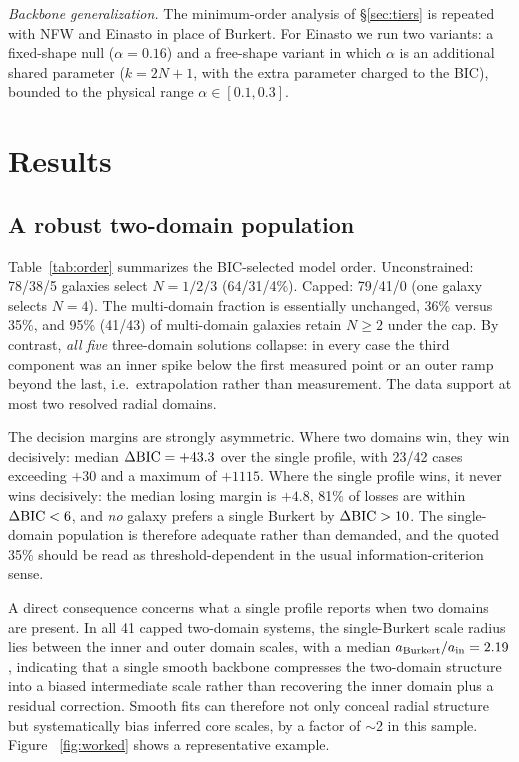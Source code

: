 \documentclass[twocolumn]{aastex701}
\newcommand{\dbic}{\Delta{\rm BIC}}
\begin{document}
\emph{Backbone generalization.} The minimum-order analysis of
\S\ref{sec:tiers} is repeated with NFW and Einasto in place of Burkert. For
Einasto we run two variants: a fixed-shape null ($\alpha = 0.16$) and a
free-shape variant in which $\alpha$ is an additional shared parameter
($k = 2N + 1$, with the extra parameter charged to the BIC), bounded to the
physical range $\alpha \in [0.1, 0.3]$.

\section{Results} \label{sec:results}

\subsection{A robust two-domain population} \label{sec:twodomain}

Table~\ref{tab:order} summarizes the BIC-selected model order.
Unconstrained: 78/38/5 galaxies select $N = 1/2/3$ (64/31/4\%). Capped:
79/41/0 (one galaxy selects $N = 4$). The multi-domain fraction is
essentially unchanged, 36\% versus 35\%, and 95\% (41/43) of multi-domain
galaxies retain $N \ge 2$ under the cap. By contrast, \emph{all five}
three-domain solutions collapse: in every case the third component was an
inner spike below the first measured point or an outer ramp beyond the last,
i.e.\ extrapolation rather than measurement. The data support at most two
resolved radial domains.

The decision margins are strongly asymmetric. Where two domains win, they win
decisively: median $\dbic = +43.3$ over the single profile, with 23/42 cases
exceeding $+30$ and a maximum of $+1115$. Where the single profile wins, it
never wins decisively: the median losing margin is $+4.8$, 81\% of losses are
within $\dbic < 6$, and \emph{no} galaxy prefers a single Burkert by
$\dbic > 10$. The single-domain population is therefore adequate rather than
demanded, and the quoted 35\% should be read as threshold-dependent in the
usual information-criterion sense.

A direct consequence concerns what a single profile reports when two domains
are present. In all 41 capped two-domain systems, the single-Burkert scale
radius lies between the inner and outer domain scales, with a median
$a_{\rm Burkert}/a_{\rm in} = 2.19$, indicating that a single smooth
backbone compresses the two-domain structure into a biased intermediate scale
rather than recovering the inner domain plus a residual correction. Smooth
fits can therefore not only conceal radial structure but systematically bias
inferred core scales, by a factor of $\sim$2 in this sample. Figure~%
\ref{fig:worked} shows a representative example.
\end{document}
